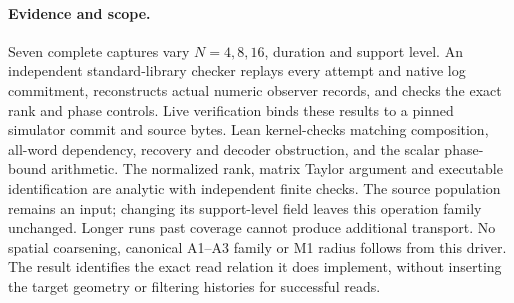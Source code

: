 \paragraph{Evidence and scope.}
Seven complete captures vary $N=4,8,16$, duration and support level.
An independent standard-library checker replays every attempt and native
log commitment, reconstructs actual numeric observer records, and checks
the exact rank and phase controls. Live verification binds these results
to a pinned simulator commit and source bytes. Lean kernel-checks matching
composition, all-word dependency, recovery and decoder obstruction, and
the scalar phase-bound arithmetic. The normalized rank, matrix Taylor
argument and executable identification are analytic with independent
finite checks. The source population remains an input; changing its
support-level field leaves this operation family unchanged. Longer runs
past coverage cannot produce additional transport. No spatial coarsening,
canonical A1--A3 family or M1 radius follows from this driver. The result
identifies the exact read relation it does implement, without inserting
the target geometry or filtering histories for successful reads.
